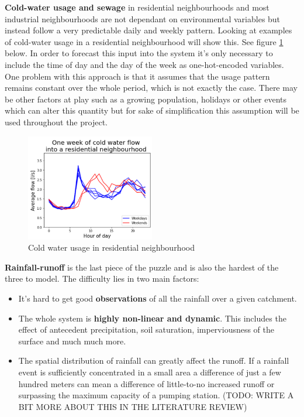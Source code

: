 \textbf{Cold-water usage and sewage} in residential neighbourhoods and most industrial neighbourhoods are not dependant on environmental variables but instead follow a very predictable daily and weekly pattern. Looking at examples of cold-water usage in a residential neighbourhood will show this. See figure \ref{fig:coldwaterusage} below. In order to forecast this input into the system it's only necessary to include the time of day and the day of the week as one-hot-encoded variables. One problem with this approach is that it assumes that the usage pattern remains constant over the whole period, which is not exactly the case. There may be other factors at play such as a growing population, holidays or other events which can alter this quantity but for sake of simplification this assumption will be used throughout the project. 

\begin{figure}[H]
\centering\includegraphics[width=0.5\textwidth]{Pictures/Plots/cold water usage.png}
\caption{Cold water usage in residential neighbourhood}
\label{fig:coldwaterusage}
\end{figure}

\textbf{Rainfall-runoff }is the last piece of the puzzle and is also the hardest of the three to model. The difficulty lies in two main factors:
\begin{itemize}
\item It's hard to get good\textbf{ observations} of all the rainfall over a given catchment.
\item The whole system is \textbf{highly non-linear and dynamic}. This includes the effect of antecedent precipitation, soil saturation, imperviousness of the surface and much much more.
\item The spatial distribution of rainfall can greatly affect the runoff. If a rainfall event is sufficiently concentrated in a small area a difference of just a few hundred meters can mean a difference of little-to-no increased runoff or surpassing the maximum capacity of a pumping station. (TODO: WRITE A BIT MORE ABOUT THIS IN THE LITERATURE REVIEW)
\end{itemize}

